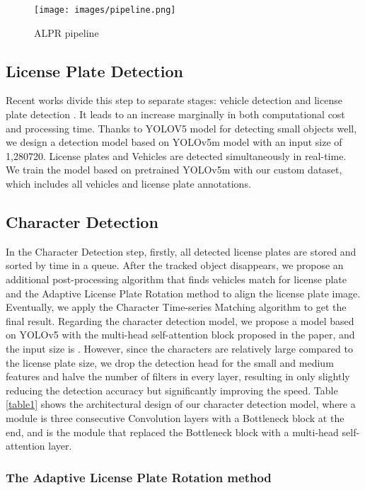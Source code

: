 \documentclass[conference]{IEEEtran}
\begin{document}
\begin{figure*}[t]
\centering
\texttt{[image: images/pipeline.png]}
\caption{ALPR pipeline}    
\label{ALPR pipeline}

\end{figure*}

\subsection{License Plate Detection}
Recent works divide this step to separate stages: vehicle detection and license plate detection \cite{ufpr, layout}. It leads to an increase marginally in both computational cost and processing time. Thanks to YOLOV5 model for detecting small objects well, we design a detection model based on YOLOv5m model with an input size of 1,280720. License plates and Vehicles are detected simultaneously in real-time. We train the model based on pretrained YOLOv5m with our custom dataset, which includes all vehicles and license plate annotations.


\subsection{Character Detection}

In the Character Detection step, firstly, all detected license plates are stored and sorted by time in a queue. After the tracked object disappears, we propose an additional post-processing algorithm that finds vehicles match for license plate and the Adaptive License Plate Rotation method to align the license plate image. Eventually, we apply the Character Time-series Matching algorithm to get the final result. Regarding the character detection model, we propose a model based on YOLOv5 with the multi-head self-attention block proposed in the paper\cite{attention}, and the input size is . However, since the characters are relatively large compared to the license plate size, we drop the detection head for the small and medium features and halve the number of filters in every layer, resulting in only slightly reducing the detection accuracy but significantly improving the speed. Table \ref{table1} shows the architectural design of our character detection model, where a  module is three consecutive Convolution layers with a Bottleneck block at the end, and  is the  module that replaced the Bottleneck block with a multi-head self-attention layer.

\subsubsection{The Adaptive License Plate Rotation method}
\end{document}

